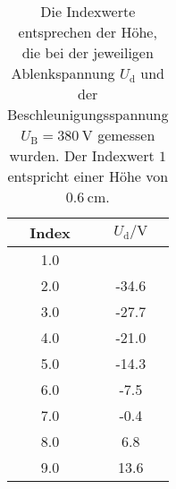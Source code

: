 \begin{table}\caption{Die Indexwerte entsprechen der Höhe, die bei der jeweiligen Ablenkspannung $U_\text{d}$ und der Beschleunigungsspannung $U_\text{B} = \SI{380}{\volt}$ gemessen wurden. Der Indexwert $1$ entspricht einer Höhe von $\SI{0.6}{\centi\meter}$.}
\label{taba5}
\centering
{}
\begin{tabular}{S[]S[]} 
\toprule
{Index} & {$U_\text{d} / \si{\volt}$}\\
 & \\
2.0 & -34.6\\
3.0 & -27.7\\
4.0 & -21.0\\
5.0 & -14.3\\
6.0 & -7.5\\
7.0 & -0.4\\
8.0 & 6.8\\
9.0 & 13.6\\
\bottomrule
\end{tabular}\end{table}
